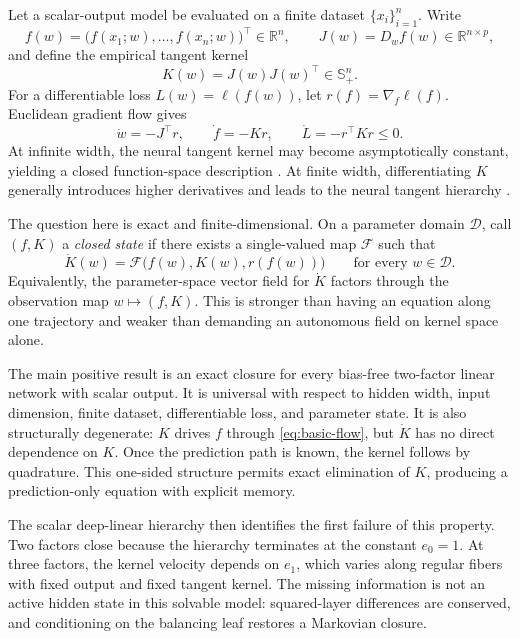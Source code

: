 \documentclass[11pt]{article}
\newcommand{\R}{\mathbb{R}}
\newcommand{\Spos}{\mathbb{S}_{+}}
\begin{document}
Let a scalar-output model be evaluated on a finite dataset $\{x_i\}_{i=1}^n$.  Write
\begin{equation}
  f(w)=\bigl(f(x_1;w),\ldots,f(x_n;w)\bigr)^\top\in\R^n,
  \qquad
  J(w)=D_w f(w)\in\R^{n\times p},
\end{equation}
and define the empirical tangent kernel
\begin{equation}
  K(w)=J(w)J(w)^\top\in\Spos^n.
\end{equation}
For a differentiable loss $L(w)=\ell(f(w))$, let $r(f)=\nabla_f\ell(f)$.  Euclidean gradient flow gives
\begin{equation}
  \dot w=-J^\top r,
  \qquad
  \dot f=-Kr,
  \qquad
  \dot L=-r^\top Kr\leq0.
  \label{eq:basic-flow}
\end{equation}
At infinite width, the neural tangent kernel may become asymptotically constant, yielding a closed function-space description \citep{jacot2018ntk,lee2019linearized}.  At finite width, differentiating $K$ generally introduces higher derivatives and leads to the neural tangent hierarchy \citep{huang2020nth}.

The question here is exact and finite-dimensional.  On a parameter domain $\mathcal D$, call $(f,K)$ a \emph{closed state} if there exists a single-valued map $\mathcal F$ such that
\begin{equation}
  \dot K(w)=\mathcal F\bigl(f(w),K(w),r(f(w))\bigr)
  \qquad \text{for every }w\in\mathcal D.
  \label{eq:closure-definition}
\end{equation}
Equivalently, the parameter-space vector field for $\dot K$ factors through the observation map $w\mapsto(f,K)$.  This is stronger than having an equation along one trajectory and weaker than demanding an autonomous field on kernel space alone.

The main positive result is an exact closure for every bias-free two-factor linear network with scalar output.  It is universal with respect to hidden width, input dimension, finite dataset, differentiable loss, and parameter state.  It is also structurally degenerate: $K$ drives $f$ through \eqref{eq:basic-flow}, but $\dot K$ has no direct dependence on $K$.  Once the prediction path is known, the kernel follows by quadrature.  This one-sided structure permits exact elimination of $K$, producing a prediction-only equation with explicit memory.

The scalar deep-linear hierarchy then identifies the first failure of this property.  Two factors close because the hierarchy terminates at the constant $e_0=1$.  At three factors, the kernel velocity depends on $e_1$, which varies along regular fibers with fixed output and fixed tangent kernel.  The missing information is not an active hidden state in this solvable model: squared-layer differences are conserved, and conditioning on the balancing leaf restores a Markovian closure.
\end{document}
